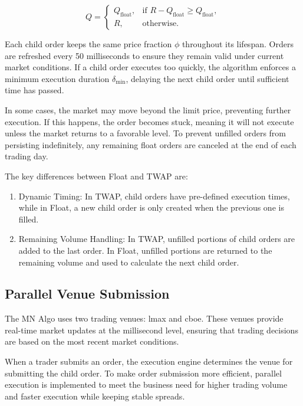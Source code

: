 \begin{equation}
    Q = 
    \begin{cases} 
        Q_{\text{float}}, & \text{if } R - Q_{\text{float}} \geq Q_{\text{float}}, \\
        R, & \text{otherwise}.
    \end{cases}
\end{equation}

Each child order keeps the same price fraction $\phi$ throughout its lifespan. Orders are refreshed every 50 milliseconds to ensure they remain valid under current market conditions. If a child order executes too quickly, the algorithm enforces a minimum execution duration $\delta_{\text{min}}$, delaying the next child order until sufficient time has passed.

In some cases, the market may move beyond the limit price, preventing further execution. If this happens, the order becomes stuck, meaning it will not execute unless the market returns to a favorable level. To prevent unfilled orders from persisting indefinitely, any remaining float orders are canceled at the end of each trading day.

The key differences between Float and TWAP are:
\begin{enumerate}
    \item Dynamic Timing: In TWAP, child orders have pre-defined execution times, while in Float, a new child order is only created when the previous one is filled.
    \item Remaining Volume Handling: In TWAP, unfilled portions of child orders are added to the last order. In Float, unfilled portions are returned to the remaining volume and used to calculate the next child order.
\end{enumerate}

\subsection{Parallel Venue Submission}
The MN Algo uses two trading venues: \acrshort{lmax} and \acrshort{cboe}. These venues provide real-time market updates at the millisecond level, ensuring that trading decisions are based on the most recent market conditions. 

When a trader submits an order, the execution engine determines the venue for submitting the child order. To make order submission more efficient, parallel execution is implemented to meet the business need for higher trading volume and faster execution while keeping stable spreads.

